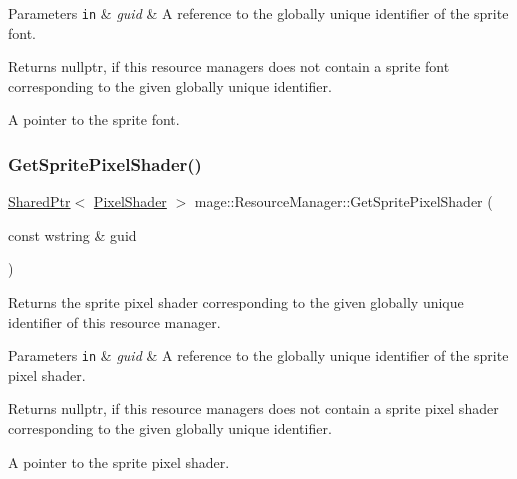 \begin{DoxyParams}[1]{Parameters}
\mbox{\tt in}  & {\em guid} & A reference to the globally unique identifier of the sprite font. \\
\hline
\end{DoxyParams}
\begin{DoxyReturn}{Returns}
{\ttfamily nullptr}, if this resource managers does not contain a sprite font corresponding to the given globally unique identifier. 

A pointer to the sprite font. 
\end{DoxyReturn}
\hypertarget{classmage_1_1_resource_manager_a792f554641a11f5782ffccb5b3f0364c}{}\label{classmage_1_1_resource_manager_a792f554641a11f5782ffccb5b3f0364c} 
\subsubsection{\texorpdfstring{Get\+Sprite\+Pixel\+Shader()}{GetSpritePixelShader()}}
{\footnotesize\ttfamily \hyperlink{namespacemage_a1e01ae66713838a7a67d30e44c67703e}{Shared\+Ptr}$<$ \hyperlink{classmage_1_1_pixel_shader}{Pixel\+Shader} $>$ mage\+::\+Resource\+Manager\+::\+Get\+Sprite\+Pixel\+Shader (\begin{DoxyParamCaption}\item[{const wstring \&}]{guid }\end{DoxyParamCaption})\hspace{0.3cm}{\ttfamily [noexcept]}}

Returns the sprite pixel shader corresponding to the given globally unique identifier of this resource manager.


\begin{DoxyParams}[1]{Parameters}
\mbox{\tt in}  & {\em guid} & A reference to the globally unique identifier of the sprite pixel shader. \\
\hline
\end{DoxyParams}
\begin{DoxyReturn}{Returns}
{\ttfamily nullptr}, if this resource managers does not contain a sprite pixel shader corresponding to the given globally unique identifier. 

A pointer to the sprite pixel shader. 
\end{DoxyReturn}
\hypertarget{classmage_1_1_resource_manager_a1ac90a5ce2cee1a06731bc8c57b86deb}{}\label{classmage_1_1_resource_manager_a1ac90a5ce2cee1a06731bc8c57b86deb} 
